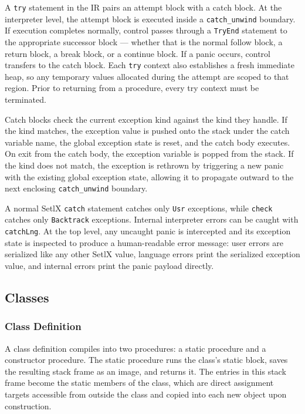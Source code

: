 A \texttt{try} statement in the IR pairs an attempt block with a catch block. At the interpreter level, the attempt block is executed inside a \texttt{catch\_unwind} boundary. If execution completes normally, control passes through a \texttt{TryEnd} statement to the appropriate successor block --- whether that is the normal follow block, a return block, a break block, or a continue block. If a panic occurs, control transfers to the catch block. Each \texttt{try} context also establishes a fresh immediate heap, so any temporary values allocated during the attempt are scoped to that region. Prior to returning from a procedure, every try context must be terminated.

Catch blocks check the current exception kind against the kind they handle. If the kind matches, the exception value is pushed onto the stack under the catch variable name, the global exception state is reset, and the catch body executes. On exit from the catch body, the exception variable is popped from the stack. If the kind does not match, the exception is rethrown by triggering a new panic with the existing global exception state, allowing it to propagate outward to the next enclosing \texttt{catch\_unwind} boundary.

A normal SetlX \texttt{catch} statement catches only \texttt{Usr} exceptions, while \texttt{check} catches only \texttt{Backtrack} exceptions. Internal interpreter errors can be caught with \texttt{catchLng}. At the top level, any uncaught panic is intercepted and its exception state is inspected to produce a human-readable error message: user errors are serialized like any other SetlX value, language errors print the serialized exception value, and internal errors print the panic payload directly. 

\subsection{Classes}

\subsubsection{Class Definition}

A class definition compiles into two procedures: a static procedure and a constructor procedure. The static procedure runs the class's static block, saves the resulting stack frame as an image, and returns it. The entries in this stack frame become the static members of the class, which are direct assignment targets accessible from outside the class and copied into each new object upon construction.

